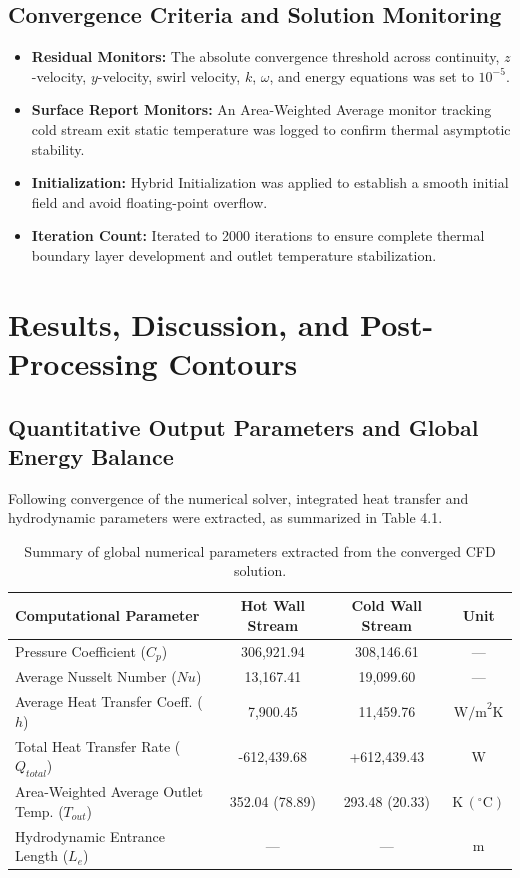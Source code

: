 \documentclass[12pt,a4paper]{report}
\begin{document}
\section{Convergence Criteria and Solution Monitoring}
\begin{itemize}
    \item \textbf{Residual Monitors:} The absolute convergence threshold across continuity, $z$-velocity, $y$-velocity, swirl velocity, $k$, $\omega$, and energy equations was set to $10^{-5}$.
    \item \textbf{Surface Report Monitors:} An Area-Weighted Average monitor tracking cold stream exit static temperature was logged to confirm thermal asymptotic stability.
    \item \textbf{Initialization:} Hybrid Initialization was applied to establish a smooth initial field and avoid floating-point overflow.
    \item \textbf{Iteration Count:} Iterated to 2000 iterations to ensure complete thermal boundary layer development and outlet temperature stabilization.
\end{itemize}


\chapter{Results, Discussion, and Post-Processing Contours}

\section{Quantitative Output Parameters and Global Energy Balance}
Following convergence of the numerical solver, integrated heat transfer and hydrodynamic parameters were extracted, as summarized in Table 4.1.

\begin{table}[H]
\centering
\caption{Summary of global numerical parameters extracted from the converged CFD solution.}
\label{tab:global_parameters}
\begin{tabular}{lccc}
\toprule
\textbf{Computational Parameter} & \textbf{Hot Wall Stream} & \textbf{Cold Wall Stream} & \textbf{Unit} \\
\midrule
Pressure Coefficient ($C_p$) & 306,921.94 & 308,146.61 & --- \\
Average Nusselt Number ($Nu$) & 13,167.41 & 19,099.60 & --- \\
Average Heat Transfer Coeff. ($h$) & 7,900.45 & 11,459.76 & $\text{W/m}^2\text{K}$ \\
Total Heat Transfer Rate ($Q_{total}$) & -612,439.68 & +612,439.43 & W \\
Area-Weighted Average Outlet Temp. ($T_{out}$) & 352.04 (78.89) & 293.48 (20.33) & $\text{K}\,(^\circ\text{C})$ \\
Hydrodynamic Entrance Length ($L_e$) & --- & --- & m \\
\bottomrule
\end{tabular}
\end{table}
\end{document}
